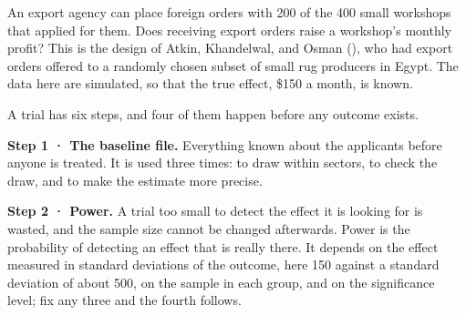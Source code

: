 \documentclass[
  letterpaper,
  10pt,
  twoside,
  openright,
  numbers=noenddot,
  chapterprefix=true]{scrbook}
\begin{document}
An export agency can place foreign orders with 200 of the 400 small
workshops that applied for them. Does receiving export orders raise a
workshop's monthly profit? This is the design of Atkin, Khandelwal, and
Osman (), who had export orders offered to
a randomly chosen subset of small rug producers in Egypt. The data here
are simulated, so that the true effect, \$150 a month, is known.

A trial has six steps, and four of them happen before any outcome
exists.

\textbf{Step 1 · The baseline file.} Everything known about the
applicants before anyone is treated. It is used three times: to draw
within sectors, to check the draw, and to make the estimate more
precise.

\textbf{Step 2 · Power.} A trial too small to detect the effect it is
looking for is wasted, and the sample size cannot be changed afterwards.
Power is the probability of detecting an effect that is really there. It
depends on the effect measured in standard deviations of the outcome,
here 150 against a standard deviation of about 500, on the sample in
each group, and on the significance level; fix any three and the fourth
follows.
\end{document}
